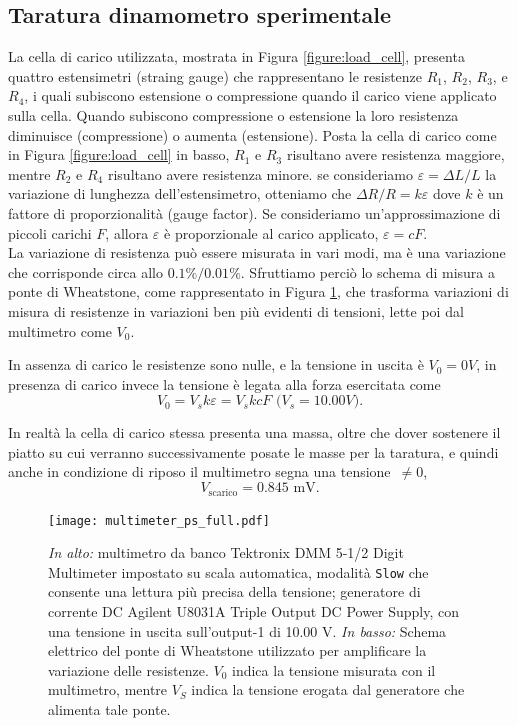\documentclass[italian, a4paper, 10pt, twocolumn]{../../style/lab_unige}
\newcommand{\reffig}[1]{Figura {\ref{#1}}}%
\begin{document}
    \subsection{Taratura dinamometro sperimentale}

    La cella di carico utilizzata, mostrata in \reffig{figure:load_cell}, presenta quattro estensimetri (straing gauge) che rappresentano le resistenze $R_1$, $R_2$, $R_3$, e $R_4$, i quali subiscono estensione o compressione quando il carico viene applicato sulla cella. Quando subiscono compressione o estensione la loro resistenza diminuisce (compressione) o aumenta (estensione). Posta la cella di carico come in \reffig{figure:load_cell} in basso, $R_1$ e $R_3$ risultano avere resistenza maggiore, mentre $R_2$ e $R_4$ risultano avere resistenza minore. se consideriamo $\varepsilon=\Delta L/L$ la variazione di lunghezza dell'estensimetro, otteniamo che $\Delta R/R = k\varepsilon$ dove $k$ è un fattore di proporzionalità (gauge factor). Se consideriamo un’approssimazione di piccoli carichi $F$, allora $\varepsilon$ è proporzionale al carico applicato, $\varepsilon=cF$.\\
    La variazione di resistenza può essere misurata in vari modi, ma è una variazione che corrisponde circa allo $0.1\%/0.01\%$. Sfruttiamo perciò lo schema di misura a ponte di Wheatstone, come rappresentato in \reffig{figure:multimeter_ps}, che trasforma variazioni di misura di resistenze in variazioni ben più evidenti di tensioni, lette poi dal multimetro come $V_0$.

    In assenza di carico le resistenze sono nulle, e la tensione in uscita è $V_0=0V$, in presenza di carico invece la tensione è legata alla forza esercitata come
    \begin{equation}
        V_0=V_sk\varepsilon=V_skcF\text{ ($V_s=10.00V$).}\label{equation:v0_f}
    \end{equation}

    In realtà la cella di carico stessa presenta una massa, oltre che dover sostenere il piatto su cui verranno successivamente posate le masse per la taratura, e quindi anche in condizione di riposo il multimetro segna una tensione~$\neq0$, 
    \[V_{\text{scarico}}=0.845\text{ mV.}\]

    \begin{figure}
        \centering
        \texttt{[image: multimeter\_ps\_full.pdf]}
        \caption{\textit{In alto:} multimetro da banco Tektronix DMM 5-1/2 Digit Multimeter impostato su scala automatica, modalità \texttt{Slow} che consente una lettura più precisa della tensione; generatore di corrente DC Agilent U8031A Triple Output DC Power Supply, con una tensione in uscita sull'output-1 di 10.00 V. \textit{In basso:} Schema elettrico del ponte di Wheatstone utilizzato per amplificare la variazione delle resistenze. $V_0$ indica la tensione misurata con il multimetro, mentre $V_S$ indica la tensione erogata dal generatore che alimenta tale ponte.}
        \label{figure:multimeter_ps}
    \end{figure}
\end{document}

